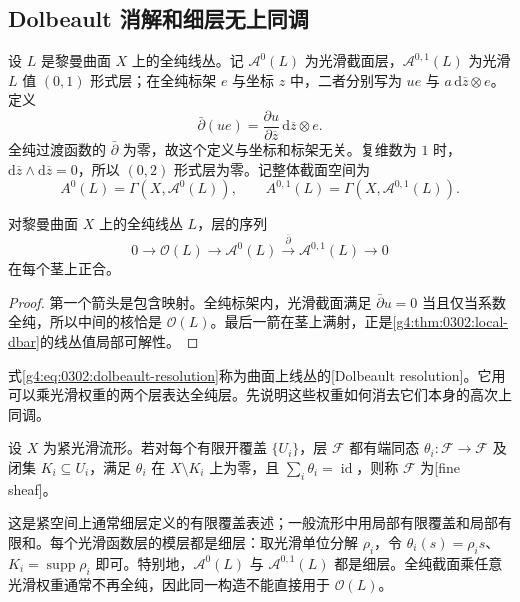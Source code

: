 \subsection{Dolbeault 消解和细层无上同调}
\label{g4:subsec:0302:04}

设 \(L\) 是黎曼曲面 \(X\) 上的全纯线丛。记 \(\mathcal A^0(L)\) 为光滑截面层，\(\mathcal A^{0,1}(L)\) 为光滑 \(L\) 值 \((0,1)\) 形式层；在全纯标架 \(e\) 与坐标 \(z\) 中，二者分别写为 \(u e\) 与 \(a\,\mathrm{d}\overline z\otimes e\)。定义
\[
 \bar\partial(u e)
 =\frac{\partial u}{\partial\overline z}\,\mathrm{d}\overline z\otimes e.
\]
全纯过渡函数的 \(\bar\partial\) 为零，故这个定义与坐标和标架无关。复维数为 \(1\) 时，\(\mathrm{d}\overline z\wedge\mathrm{d}\overline z=0\)，所以 \((0,2)\) 形式层为零。记整体截面空间为
\[
 A^0(L)=\Gamma(X,\mathcal A^0(L)),\qquad
 A^{0,1}(L)=\Gamma(X,\mathcal A^{0,1}(L)).
\]

\begin{proposition}
\label{g4:prop:0302:dolbeault-resolution}
对黎曼曲面 \(X\) 上的全纯线丛 \(L\)，层的序列
\begin{equation}
\label{g4:eq:0302:dolbeault-resolution}
 0\longrightarrow\mathcal O(L)
 \longrightarrow\mathcal A^0(L)
 \xrightarrow{\ \bar\partial\ }\mathcal A^{0,1}(L)
 \longrightarrow0
\end{equation}
在每个茎上正合。
\end{proposition}
\begin{proof}
第一个箭头是包含映射。全纯标架内，光滑截面满足 \(\bar\partial u=0\) 当且仅当系数全纯，所以中间的核恰是 \(\mathcal O(L)\)。最后一箭在茎上满射，正是\cref{g4:thm:0302:local-dbar}的线丛值局部可解性。
\end{proof}

式\eqref{g4:eq:0302:dolbeault-resolution}称为曲面上线丛的[Dolbeault resolution]。它用可以乘光滑权重的两个层表达全纯层。先说明这些权重如何消去它们本身的高次上同调。

\begin{definition}
\label{g4:def:0302:fine-sheaf}
设 \(X\) 为紧光滑流形。若对每个有限开覆盖 \(\{U_i\}\)，层 \(\mathcal F\) 都有端同态 \(\theta_i:\mathcal F\to\mathcal F\) 及闭集 \(K_i\subseteq U_i\)，满足 \(\theta_i\) 在 \(X\setminus K_i\) 上为零，且 \(\sum_i\theta_i=\operatorname{id}\)，则称 \(\mathcal F\) 为[fine sheaf]。
\end{definition}

这是紧空间上通常细层定义的有限覆盖表述；一般流形中用局部有限覆盖和局部有限和。每个光滑函数层的模层都是细层：取光滑单位分解 \(\rho_i\)，令 \(\theta_i(s)=\rho_i s\)、\(K_i=\operatorname{supp}\rho_i\) 即可。特别地，\(\mathcal A^0(L)\) 与 \(\mathcal A^{0,1}(L)\) 都是细层。全纯截面乘任意光滑权重通常不再全纯，因此同一构造不能直接用于 \(\mathcal O(L)\)。

